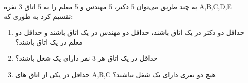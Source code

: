 \p    
به چند طریق می‌توان 5 دکتر، 5 مهندس و 5 معلم را به 5 اتاق 3 نفره A,B,C,D,E
تقسیم کرد به طوری که:
\begin{enumerate}
\item
حداقل دو دکتر در یک اتاق باشند، حداقل دو مهندس در یک اتاق باشند و حداقل دو معلم در یک اتاق باشند؟
\item
حداقل در یک اتاق هر 3 نفر دارای یک شغل باشند؟
\item
حداقل در یکی از اتاق های 
A,B,C
هیچ دو نفری دارای یک شغل نباشند؟
\end{enumerate}
